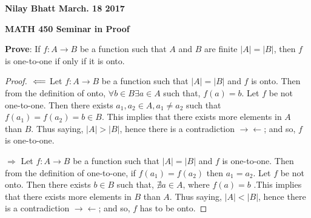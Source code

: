 \documentclass[12pt, fullpage]{article}
\begin{document}
\begin{flushleft}
\textbf{Nilay Bhatt March. 18 2017}		
\end{flushleft}
\begin{center}		
{\bf MATH 450 Seminar in Proof}
 \\
\end{center}
\textbf{Prove}: If $f: A \rightarrow B$ be a function such that $A$ and $B$ are finite $\vert A \vert = \vert B \vert$, then $f$ is one-to-one if only if it is onto.

\begin{proof}
$\\ \Longleftarrow$ Let $f: A \rightarrow B$ be a function such that $\vert A \vert = \vert B \vert$ and $f$ is onto. Then from the definition of onto, $\forall b \in B \exists a \in A$ such that, $f(a) = b$. Let $f$ be not one-to-one. Then there exists $a_1,a_2 \in A, a_1 \neq a_2$ such that $f(a_1) = f(a_2) = b \in B$. This implies that there exists more elements in $A$ than $B$. Thus saying, $\vert A \vert > \vert B \vert$, hence there is a contradiction $\rightarrow\leftarrow$; and so, $f$ is one-to-one.

$\Longrightarrow$  Let $f: A \rightarrow B$ be a function such that $\vert A \vert = \vert B \vert$ and $f$ is one-to-one. Then from the definition of one-to-one, if $f(a_1) = f(a_2)$ then $a_1 = a_2$. Let $f$ be not onto. Then there exists $b \in B$ such that, $\nexists a \in A$, where $f(a) = b$ .This implies that there exists more elements in $B$ than $A$. Thus saying, $\vert A \vert < \vert B \vert$, hence there is a contradiction $\rightarrow\leftarrow$; and so, $f$ has to be onto.
\end{proof}
\end{document}
